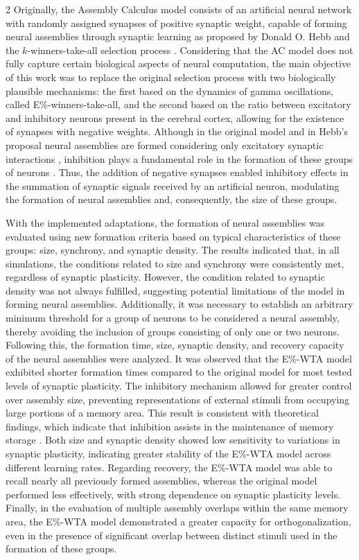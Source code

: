 \documentclass[a4paper, 10pt]{article}
\begin{document}
\begin{multicols}{2}
Originally, the Assembly Calculus model consists of an artificial neural network with randomly assigned synapses of positive synaptic weight, capable of forming neural assemblies through synaptic learning as proposed by Donald O. Hebb \cite{hebb_1949} and the $k$-winners-take-all selection process \cite{christos}. Considering that the AC model does not fully capture certain biological aspects of neural computation, the main objective of this work was to replace the original selection process with two biologically plausible mechanisms: the first based on the dynamics of gamma oscillations, called E\%-winners-take-all, and the second based on the ratio between excitatory and inhibitory neurons present in the cerebral cortex, allowing for the existence of synapses with negative weights. Although in the original model and in Hebb’s proposal neural assemblies are formed considering only excitatory synaptic interactions \cite{Traub2020-do}, inhibition plays a fundamental role in the formation of these groups of neurons \cite{sadra}. Thus, the addition of negative synapses enabled inhibitory effects in the summation of synaptic signals received by an artificial neuron, modulating the formation of neural assemblies and, consequently, the size of these groups.

With the implemented adaptations, the formation of neural assemblies was evaluated using new formation criteria based on typical characteristics of these groups: size, synchrony, and synaptic density. The results indicated that, in all simulations, the conditions related to size and synchrony were consistently met, regardless of synaptic plasticity. However, the condition related to synaptic density was not always fulfilled, suggesting potential limitations of the model in forming neural assemblies. Additionally, it was necessary to establish an arbitrary minimum threshold for a group of neurons to be considered a neural assembly, thereby avoiding the inclusion of groups consisting of only one or two neurons. Following this, the formation time, size, synaptic density, and recovery capacity of the neural assemblies were analyzed. It was observed that the E\%-WTA model exhibited shorter formation times compared to the original model for most tested levels of synaptic plasticity. The inhibitory mechanism allowed for greater control over assembly size, preventing representations of external stimuli from occupying large portions of a memory area. This result is consistent with theoretical findings, which indicate that inhibition assists in the maintenance of memory storage \cite{Mongillo2018-ux}. Both size and synaptic density showed low sensitivity to variations in synaptic plasticity, indicating greater stability of the E\%-WTA model across different learning rates. Regarding recovery, the E\%-WTA model was able to recall nearly all previously formed assemblies, whereas the original model performed less effectively, with strong dependence on synaptic plasticity levels. Finally, in the evaluation of multiple assembly overlaps within the same memory area, the E\%-WTA model demonstrated a greater capacity for orthogonalization, even in the presence of significant overlap between distinct stimuli used in the formation of these groups.


\end{multicols}
\end{document}
